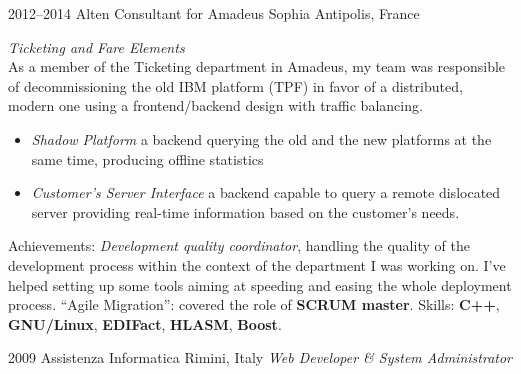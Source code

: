 \documentclass[]{friggeri-cv}
\begin{document}
\begin{entrylist}
  \entry
      {2012--2014}
      {Alten Consultant for Amadeus}
      {Sophia Antipolis, France}
      {\emph{Ticketing and Fare Elements} \\
        As a member of the Ticketing department in Amadeus, my team was
        responsible of decommissioning the old IBM platform (TPF) in favor of a
        distributed, modern one using a frontend/backend design with traffic
        balancing.
        \begin{itemize}
        \item \emph{Shadow Platform} a backend querying the old and the new
          platforms at the same time, producing offline statistics
        \item \emph{Customer's Server Interface} a backend capable to query a
          remote dislocated server providing real-time information based on the
          customer's needs.
        \end{itemize}
        Achievements: \emph{Development quality coordinator}, handling the
        quality of the development process within the context of the department
        I was working on. I've helped setting up some tools aiming at speeding
        and easing the whole deployment process. ``Agile Migration'': covered
        the role of \textbf{SCRUM master}. Skills: \textbf{C++},
        \textbf{GNU/Linux}, \textbf{EDIFact}, \textbf{HLASM}, \textbf{Boost}.
      }
\end{entrylist}

\begin{entrylist}
  \entry
      {2009}
      {Assistenza Informatica}
      {Rimini, Italy}
      {\emph{Web Developer \& System Administrator}}
\end{entrylist}


\end{document}

